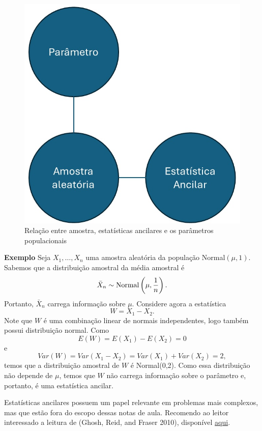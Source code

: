 \documentclass[
  letterpaper,
  DIV=11,
  numbers=noendperiod]{scrartcl}
\begin{document}
\begin{figure}

{\centering \includegraphics{fig_stat_ancilar.jpg}

}

\caption{Relação entre amostra, estatísticas ancilares e os parâmetros
populacionais}

\end{figure}%

\textbf{Exemplo} Seja \(X_1,\ldots,X_{n}\) uma amostra aleatória da
população Normal\((\mu,1)\). Sabemos que a distribuição amostral da
média amostral é
\[\bar{X}_n\sim\hbox{Normal}\left(\mu,\frac{1}{n}\right).\] Portanto,
\(\bar{X}_n\) carrega informação sobre \(\mu\). Considere agora a
estatística \[W=X_1-X_2.\] Note que \(W\) é uma combinação linear de
normais independentes, logo também possui distribuição normal. Como
\[E(W)=E(X_1)-E(X_2)=0\] e \[Var(W)=Var(X_1-X_2)=Var(X_1)+Var(X_2)=2,\]
temos que a distribuição amostral de \(W\) é Normal(0,2). Como essa
distribuição não depende de \(\mu\), temos que \(W\) não carrega
informação sobre o parâmetro e, portanto, é uma estatística ancilar.

Estatísticas ancilares possuem um papel relevante em problemas mais
complexos, mas que estão fora do escopo dessas notas de aula. Recomendo
ao leitor interessado a leitura de (Ghosh, Reid, and Fraser 2010),
disponível
\href{https://utstat.toronto.edu/reid/research/A20n41.pdf}{aqui}.
\end{document}
